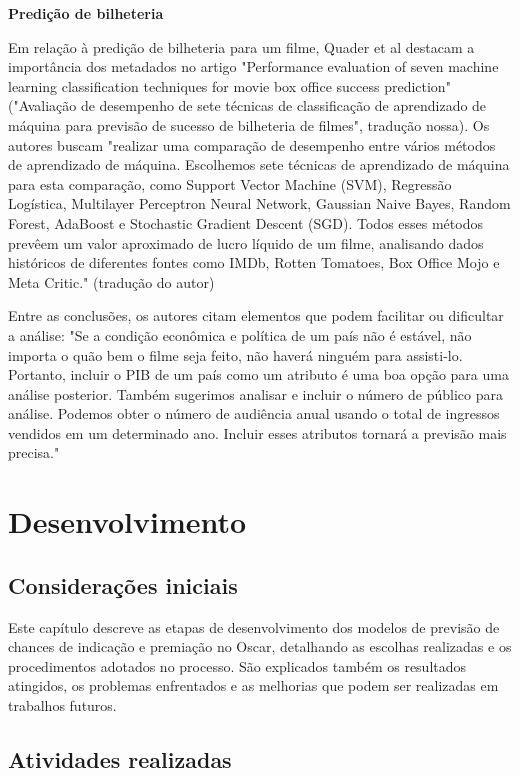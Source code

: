         \textbf{Predição de bilheteria}\par
        Em relação à predição de bilheteria para um filme, Quader et al destacam a importância dos metadados no artigo "Performance evaluation of seven machine learning classification techniques for movie box office success prediction" ("Avaliação de desempenho de sete técnicas de classificação de aprendizado de máquina para previsão de sucesso de bilheteria de filmes", tradução nossa). Os autores buscam "realizar uma comparação de desempenho entre vários métodos de aprendizado de máquina. Escolhemos sete técnicas de aprendizado de máquina para esta comparação, como Support Vector Machine (SVM), Regressão Logística, Multilayer Perceptron Neural Network, Gaussian Naive Bayes, Random Forest, AdaBoost e Stochastic Gradient Descent (SGD). Todos esses métodos prevêem um valor aproximado de lucro líquido de um filme, analisando dados históricos de diferentes fontes como IMDb, Rotten Tomatoes, Box Office Mojo e Meta Critic." \cite{quader2017} (tradução do autor)\par
        Entre as conclusões, os autores citam elementos que podem facilitar ou dificultar a análise: "Se a condição econômica e política de um país não é estável, não importa o quão bem o filme seja feito, não haverá ninguém para assisti-lo. Portanto, incluir o PIB de um país como um atributo é uma boa opção para uma análise posterior. Também sugerimos analisar e incluir o número de público para análise. Podemos obter o número de audiência anual usando o total de ingressos vendidos em um determinado ano. Incluir esses atributos tornará a previsão mais precisa."

    \section[Desenvolvimento]{Desenvolvimento}

        \subsection{Considerações iniciais}
        Este capítulo descreve as etapas de desenvolvimento dos modelos de previsão de chances de indicação e premiação no Oscar, detalhando as escolhas realizadas e os procedimentos adotados no processo. São explicados também os resultados atingidos, os problemas enfrentados e as melhorias que podem ser realizadas em trabalhos futuros.

        \subsection{Atividades realizadas}


